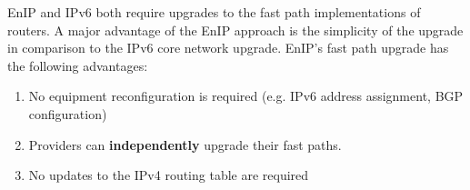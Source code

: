 EnIP and IPv6 both require upgrades to the fast path implementations
of routers.  A major advantage of the EnIP approach is the
simplicity of the upgrade in comparison to the IPv6 core network
upgrade.  EnIP's fast path upgrade has the following advantages:
\begin{enumerate}
 \item No equipment reconfiguration is required (e.g. IPv6 address
 assignment, BGP configuration) 
 \item Providers can \textbf{independently} upgrade their fast paths.
 \item No updates to the IPv4 routing table are required
\end{enumerate}
